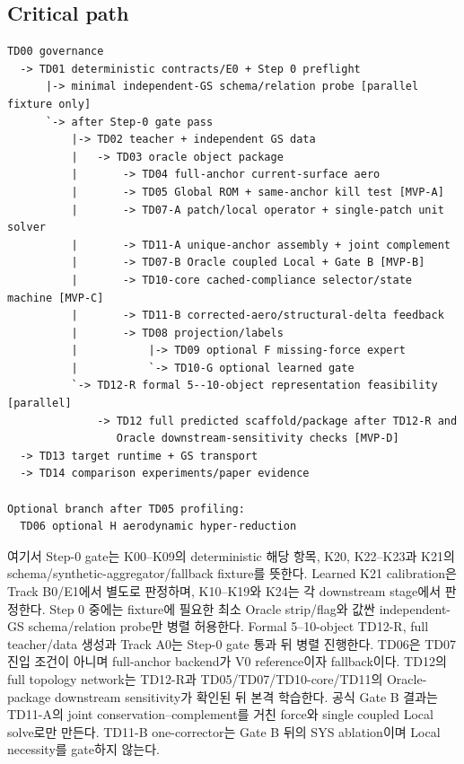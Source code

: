 \documentclass[10pt,a4paper]{article}
\begin{document}
\subsection{Critical path}

\begin{lstlisting}
TD00 governance
  -> TD01 deterministic contracts/E0 + Step 0 preflight
      |-> minimal independent-GS schema/relation probe [parallel fixture only]
      `-> after Step-0 gate pass
          |-> TD02 teacher + independent GS data
          |   -> TD03 oracle object package
          |       -> TD04 full-anchor current-surface aero
          |       -> TD05 Global ROM + same-anchor kill test [MVP-A]
          |       -> TD07-A patch/local operator + single-patch unit solver
          |       -> TD11-A unique-anchor assembly + joint complement
          |       -> TD07-B Oracle coupled Local + Gate B [MVP-B]
          |       -> TD10-core cached-compliance selector/state machine [MVP-C]
          |       -> TD11-B corrected-aero/structural-delta feedback
          |       -> TD08 projection/labels
          |           |-> TD09 optional F missing-force expert
          |           `-> TD10-G optional learned gate
          `-> TD12-R formal 5--10-object representation feasibility [parallel]
              -> TD12 full predicted scaffold/package after TD12-R and
                 Oracle downstream-sensitivity checks [MVP-D]
  -> TD13 target runtime + GS transport
  -> TD14 comparison experiments/paper evidence

Optional branch after TD05 profiling:
  TD06 optional H aerodynamic hyper-reduction
\end{lstlisting}

여기서 Step-0 gate는 K00--K09의 deterministic 해당 항목, K20, K22--K23과
K21의 schema/synthetic-aggregator/fallback fixture를 뜻한다. Learned K21 calibration은
Track B0/E1에서 별도로 판정하며, K10--K19와 K24는 각 downstream stage에서 판정한다.
Step 0 중에는 fixture에 필요한 최소 Oracle strip/flag와 값싼 independent-GS
schema/relation probe만 병렬 허용한다. Formal 5--10-object TD12-R,
full teacher/data 생성과 Track A0는 Step-0 gate 통과 뒤 병렬 진행한다.
TD06은 TD07 진입 조건이 아니며 full-anchor backend가 V0 reference이자 fallback이다.
TD12의 full topology network는 TD12-R과 TD05/TD07/TD10-core/TD11의 Oracle-package downstream sensitivity가 확인된 뒤 본격 학습한다.
공식 Gate B 결과는 TD11-A의 joint conservation--complement를 거친 force와 single coupled Local solve로만 만든다.
TD11-B one-corrector는 Gate B 뒤의 SYS ablation이며 Local necessity를 gate하지 않는다.
\end{document}
